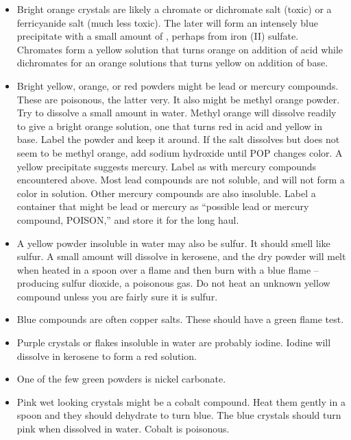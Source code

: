 \begin{itemize}

\item{Bright orange crystals are likely a chromate 
or dichromate salt (toxic) or a ferricyanide salt (much less toxic). 
The later will form an intensely blue precipitate 
with a small amount of , 
perhaps from iron (II) sulfate. 
Chromates form a yellow solution that turns orange 
on addition of acid while dichromates for an orange solutions 
that turns yellow on addition of base.}

\item{Bright yellow, 
orange, 
or red powders might be lead or mercury compounds. 
These are poisonous, 
the latter very. 
It also might be methyl orange powder. 
Try to dissolve a small amount in water. 
Methyl orange will dissolve readily to give a bright orange solution, 
one that turns red in acid and yellow in base. 
Label the powder and keep it around. 
If the salt dissolves but does not seem to be methyl orange, 
add sodium hydroxide until POP changes color. 
A yellow precipitate suggests mercury. 
Label as with mercury compounds encountered above. 
Most lead compounds are not soluble, 
and will not form a color in solution. 
Other mercury compounds are also insoluble. 
Label a container that might be lead or mercury as 
``possible lead or mercury compound, 
POISON,'' and store it for the long haul.}

\item{A yellow powder insoluble in water may also be sulfur. 
It should smell like sulfur. 
A small amount will dissolve in kerosene, 
and the dry powder will melt when heated in a spoon 
over a flame and then burn with a blue flame -- 
producing sulfur dioxide, 
a poisonous gas. 
Do not heat an unknown yellow compound 
unless you are fairly sure it is sulfur.}

\item{Blue compounds are often copper salts. 
These should have a green flame test.}

\item{Purple crystals or flakes insoluble in water are probably iodine. 
Iodine will dissolve in kerosene to form a red solution.}

\item{One of the few green powders is nickel carbonate.}

\item{Pink wet looking crystals might be a cobalt compound. 
Heat them gently in a spoon and they should dehydrate to turn blue. 
The blue crystals should turn pink when dissolved in water. 
Cobalt is poisonous.}


\end{itemize}
